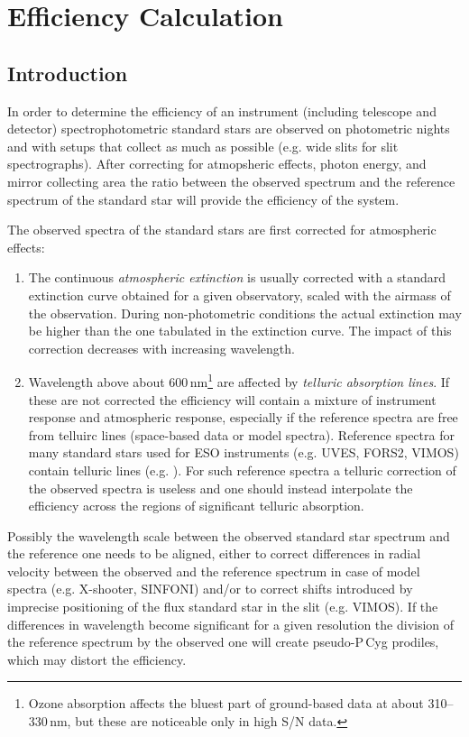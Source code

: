 \section{Efficiency Calculation}
\label{chap:algorithms:efficiency}

\subsection{Introduction}
In order to determine the efficiency of an instrument (including
telescope and detector) spectrophotometric standard stars are observed
on photometric nights and with setups that collect as much as possible
(e.g. wide slits for slit spectrographs). After correcting for atmopsheric
effects, photon energy, and mirror collecting 
area the ratio between the observed spectrum and the reference
spectrum of the standard star will provide the efficiency of the system.

The observed spectra of the standard
stars are first corrected for atmospheric effects:
\begin{enumerate}
\item The continuous {\em atmospheric extinction} is usually corrected
  with a standard extinction curve obtained for a given observatory,
  scaled with the airmass of the observation. During non-photometric
  conditions the actual extinction may be higher than the one
  tabulated in the extinction curve. The impact of this correction
  decreases with increasing wavelength. 
\item Wavelength above about 600\,nm\footnote{Ozone absorption affects
    the bluest part of ground-based data at about 310--330\,nm, but these are
    noticeable only in high S/N data.} are affected by {\em telluric
    absorption lines}. If these are not corrected the efficiency
  will contain a mixture of instrument response and atmospheric
  response, especially if the reference spectra are free from telluirc
  lines (space-based data or model spectra). Reference spectra for
  many standard stars used for ESO instruments (e.g. UVES, FORS2,
  VIMOS) contain telluric lines
  (e.g. \cite{Hamuy+92,Hamuy+94}). For such reference spectra a
  telluric correction of the observed spectra is useless and one
  should instead interpolate the efficiency across the regions of
  significant telluric absorption.
\end{enumerate}

Possibly the wavelength scale between the observed standard star
spectrum and the reference one needs to be aligned, either to correct
differences in radial velocity between the observed and the reference
spectrum in case of model spectra (e.g. X-shooter, SINFONI) and/or to
correct shifts introduced by imprecise positioning of the flux
standard star in the slit (e.g. VIMOS). If the differences in
wavelength become significant for a given resolution the division of
the reference spectrum by the observed one will create pseudo-P\,Cyg
prodiles, which may distort the efficiency.

